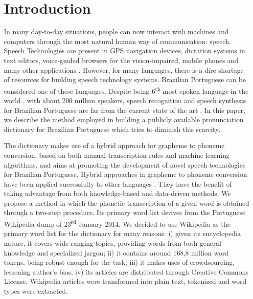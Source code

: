 %
\section{Introduction}


In many day-to-day situations, people can now interact with machines and computers through the
most natural human way of communication: speech. Speech Technologies are present in GPS navigation devices, dictation
systems in text editors, voice-guided browsers for the vision-impaired, mobile phones and many other applications \cite{Godwin2009}. 
However, for many languages, there is a dire shortage of resources for building speech technology systems. 
Brazilian Portuguese can be considered one of these languages. Despite being 6\textsuperscript{th} most
spoken language in the world \cite{Ethnologue2013}, with about 200 million speakers, speech recognition and speech 
synthesis for Brazilian Portuguese are far from the current state of the art \cite{Neto2011}. In this paper, we describe the method 
employed in building a publicly available pronunciation dictionary for Brazilian Portuguese which tries to
diminish this scarcity. 

The dictionary makes use of a hybrid approach for grapheme to phoneme conversion, 
based on both manual transcription rules and machine learning algorithms, and aims at promoting the development 
of novel speech technologies for Brazilian Portuguese. Hybrid approaches in grapheme to phoneme conversion have been applied 
successfully to other languages \cite{Damper1998}\cite{Polyakova2006}\cite{Teixeira2006}\cite{Veiga2013}. They have the benefit of taking advantage from both knowledge-based and 
data-driven methods. We propose a method in which the phonetic transcription of a given word is obtained through
a two-step procedure. Its primary word list derives from the Portuguese Wikipedia 
dump of 23\textsuperscript{rd} January 2014. We decided to use Wikipedia as the primary word list 
for the dictionary for many 
reasons: i) given its encyclopedia nature, it covers wide-ranging topics, providing words from both 
general knowledge and 
specialized jargon; ii) it contains around 168,8 million word tokens, being robust enough for the task; iii) it 
makes uses of crowdsourcing, lessening author's bias; iv) its articles are distributed through Creative Commons 
License. Wikipedia articles were transformed into plain text, tokenized and word types were extracted.

